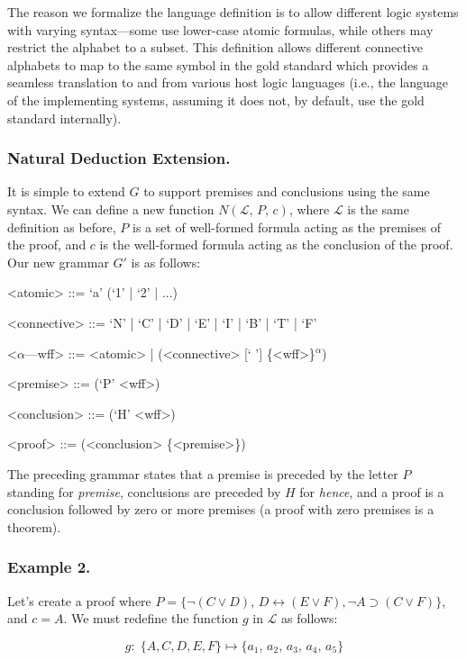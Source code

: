 \documentclass[ms]{uncgdissertationexp2}
\theoremstyle{plain}
\theoremstyle{definition}
\theoremstyle{remark}
\begin{document}
    The reason we formalize the language definition is to allow different logic systems with varying syntax---some use lower-case atomic formulas, while others may restrict the alphabet to a subset. This definition allows different connective alphabets to map to the same symbol in the gold standard which provides a seamless translation to and from various host logic languages (i.e., the language of the implementing systems, assuming it does not, by default, use the gold standard internally).

    \subsubsection{Natural Deduction Extension.} It is simple to extend $G$ to support premises and conclusions using the same syntax. We can define a new function $N(\mathcal{L},\,P,\,c)$, where $\mathcal{L}$ is the same definition as before, $P$ is a set of well-formed formula acting as the premises of the proof, and $c$ is the well-formed formula acting as the conclusion of the proof. Our new grammar $G'$ is as follows:

\begin{grammar}
<atomic> ::= `a' (`1' | `2' | ...)

<connective> ::= `N' | `C' | `D' | `E' | `I' | `B' | `T' | `F' 

<$\alpha$---wff> ::= <atomic> | (<connective> [` '] \{<wff>\}$^{\alpha}$)

<premise> ::= (`P' <wff>)

<conclusion> ::= (`H' <wff>)

<proof> ::= (<conclusion> \{<premise>\})
\end{grammar}

The preceding grammar states that a premise is preceded by the letter $P$ standing for \textit{premise}, conclusions are preceded by $H$ for \textit{hence}, and a proof is a conclusion followed by zero or more premises (a proof with zero premises is a theorem).\\


\subsubsection{Example 2.}
Let's create a proof where $P = \{\lnot(C \lor D),\,D \leftrightarrow (E \lor F), \lnot A \supset (C \lor F)\}$, and $c = A$. We must redefine the function $g$ in $\mathcal{L}$ as follows:

\[
    g:\;\{A, C, D, E, F\} \mapsto \{a_1,\,a_2,\,a_3,\,a_4,\,a_5\}
\]
\end{document}
